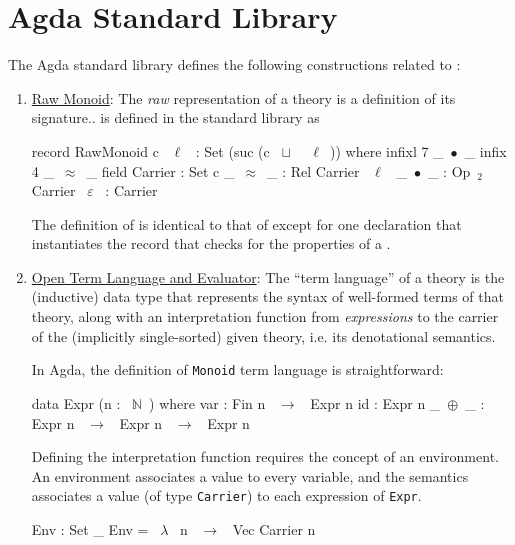 \section{Agda Standard Library}
The Agda standard library defines the following constructions related to : 
\begin{enumerate}
\item \href{https://github.com/agda/agda-stdlib/blob/4099f6184a7d8cd4c02931c3ef5a95966ab4cbb6/src/Algebra/Bundles.agda}{Raw Monoid}: The \emph{raw} representation of a theory is a definition of its signature..  is defined in the standard library as 
\begin{agdacode} 
record RawMonoid c ~$\ell$~ : Set (suc (c ~$\sqcup$~ ~$\ell$~)) where 
  infixl 7 _~$\bullet$~_
  infix 4 _~$\approx$~_
  field 
   Carrier : Set c 
   _~$\approx$~_ : Rel Carrier ~$\ell$~ 
   _~$\bullet$~_ : Op~$_2$~ Carrier 
   ~$\varepsilon$~   : Carrier 
\end{agdacode} 
The definition of  is identical to that of  except for one declaration that instantiates the  record that checks for the properties of a . 

\item \href{https://github.com/agda/agda-stdlib/blob/c61b159363ce2390049ce8e1e5422f61f17ec3b7/src/Algebra/Solver/Monoid.agda}{Open Term Language and Evaluator}:
The ``term language'' of a theory is the (inductive) data type
that represents the syntax of well-formed terms of that theory,
along with an interpretation function from \emph{expressions} 
to the carrier of the (implicitly single-sorted) given theory, i.e.
its denotational semantics.

In Agda, the definition of \lstinline|Monoid| term language is straightforward:
\begin{agdacode}
data Expr (n : ~$\mathbb{N}$~) where 
  var : Fin n ~$\to$~ Expr n 
  id : Expr n 
  _~$\oplus$~_ : Expr n ~$\to$~ Expr n ~$\to$~ Expr n 
\end{agdacode}
Defining the interpretation function requires the concept of an environment.
An environment associates a value to every variable, and the semantics
associates a value (of type \verb|Carrier|) to each expression of \verb|Expr|.
\begin{agdacode}
Env : Set _ 
Env = ~$\lambda$~ n ~$\rightarrow$~ Vec Carrier n 


\end{agdacode}
\end{enumerate}
